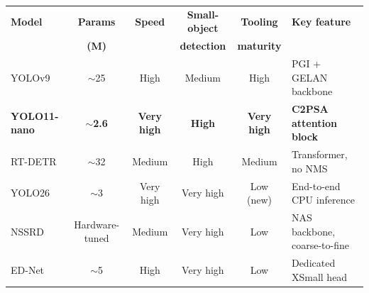 \documentclass[border=10pt]{standalone}
\begin{document}
\small
\setlength{\tabcolsep}{6pt}
\renewcommand{\arraystretch}{1.15}
\begin{tabular}{lccccl}
\toprule
\textbf{Model} & \textbf{Params} & \textbf{Speed} & \textbf{Small-object} & \textbf{Tooling} & \textbf{Key feature} \\
               & \textbf{(M)}    &                & \textbf{detection}    & \textbf{maturity} &                       \\
\midrule
YOLOv9              & $\sim$25         & High      & Medium    & High        & PGI + GELAN backbone \\
\textbf{YOLO11-nano}& \textbf{$\sim$2.6}& \textbf{Very high} & \textbf{High} & \textbf{Very high} & \textbf{C2PSA attention block} \\
RT-DETR             & $\sim$32         & Medium    & High      & Medium      & Transformer, no NMS \\
YOLO26              & $\sim$3          & Very high & Very high & Low (new)   & End-to-end CPU inference \\
NSSRD               & Hardware-tuned   & Medium    & Very high & Low         & NAS backbone, coarse-to-fine \\
ED-Net              & $\sim$5          & High      & Very high & Low         & Dedicated XSmall head \\
\bottomrule
\end{tabular}
\end{document}
